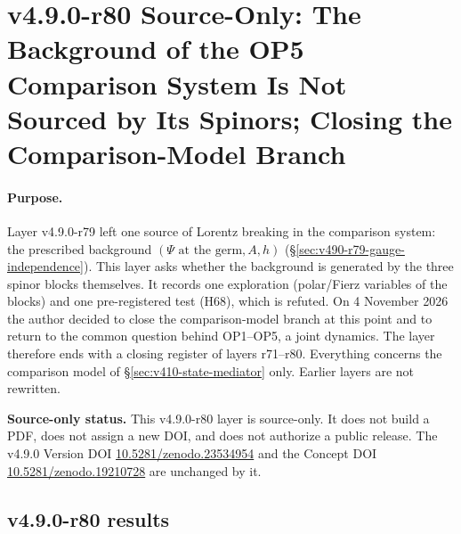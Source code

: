 
\clearpage
\section*{v4.9.0-r80 Source-Only: The Background of the OP5 Comparison System Is Not Sourced by Its Spinors; Closing the Comparison-Model Branch}
\label{sec:v490-r80-background-not-sourced}

\paragraph{Purpose.}
Layer v4.9.0-r79 left one source of Lorentz breaking in the comparison system: the prescribed background
\((\Psi\text{ at the germ},A,h)\) (\S\ref{sec:v490-r79-gauge-independence}).  This layer asks whether the background is
generated by the three spinor blocks themselves.  It records one exploration (polar/Fierz variables of the blocks) and one
pre-registered test (H68), which is refuted.  On 4 November 2026 the author decided to close the comparison-model branch at
this point and to return to the common question behind OP1--OP5, a joint dynamics.  The layer therefore ends with a closing
register of layers r71--r80.  Everything concerns the comparison model of \S\ref{sec:v410-state-mediator} only.  Earlier
layers are not rewritten.

\noindent\textbf{Source-only status.}
This v4.9.0-r80 layer is source-only.  It does not build a PDF, does not assign a new DOI,
and does not authorize a public release.  The v4.9.0 Version DOI
\href{https://doi.org/10.5281/zenodo.23534954}{10.5281/zenodo.23534954} and the Concept DOI
\href{https://doi.org/10.5281/zenodo.19210728}{10.5281/zenodo.19210728} are unchanged by it.

\subsection*{v4.9.0-r80 results}
\label{subsec:v490-r80-results}

